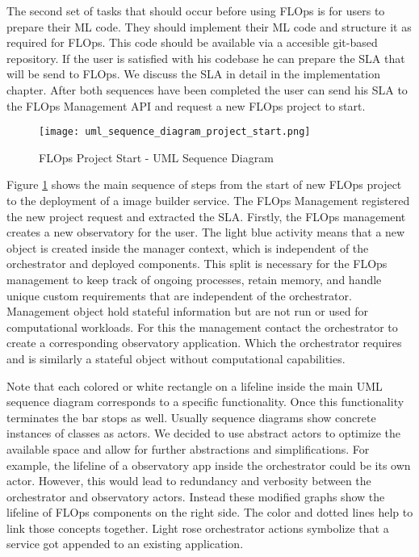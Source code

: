 The second set of tasks that should occur before using FLOps is for users to prepare their ML code.
They should implement their ML code and structure it as required for FLOps.
This code should be available via a accesible git-based repository.
If the user is satisfied with his codebase he can prepare the SLA that will be send to FLOps.
We discuss the SLA in detail in the implementation chapter.
After both sequences have been completed the user can send his SLA to the FLOps Management API and request a new FLOps project to start.


\begin{figure}[h]
    \begin{adjustwidth}{-0.2\paperwidth}{-0.2\paperwidth}
        \centering
        \texttt{[image: uml\_sequence\_diagram\_project\_start.png]}
        \caption{FLOps Project Start - UML Sequence Diagram}
        \label{fig:uml_sequence_project_start}
    \end{adjustwidth}
\end{figure}

Figure \ref{fig:uml_sequence_project_start} shows the main sequence of steps from the start of new FLOps project to the deployment of a image builder service.
The FLOps Management registered the new project request and extracted the SLA.
Firstly, the FLOps management creates a new observatory for the user.
The light blue activity means that a new object is created inside the manager context, which is independent of the orchestrator and deployed components.
This split is necessary for the FLOps management to keep track of ongoing processes, retain memory, and handle unique custom requirements that are independent of the orchestrator.
Management object hold stateful information but are not run or used for computational workloads.
For this the management contact the orchestrator to create a corresponding observatory application.
Which the orchestrator requires and is similarly a stateful object without computational capabilities.

Note that each colored or white rectangle on a lifeline inside the main UML sequence diagram corresponds to a specific functionality.
Once this functionality terminates the bar stops as well.
Usually sequence diagrams show concrete instances of classes as actors.
We decided to use abstract actors to optimize the available space and allow for further abstractions and simplifications.
For example, the lifeline of a observatory app inside the orchestrator could be its own actor.
However, this would lead to redundancy and verbosity between the orchestrator and observatory actors.
Instead these modified graphs show the lifeline of FLOps components on the right side.
The color and dotted lines help to link those concepts together.
Light rose orchestrator actions symbolize that a service got appended to an existing application.


